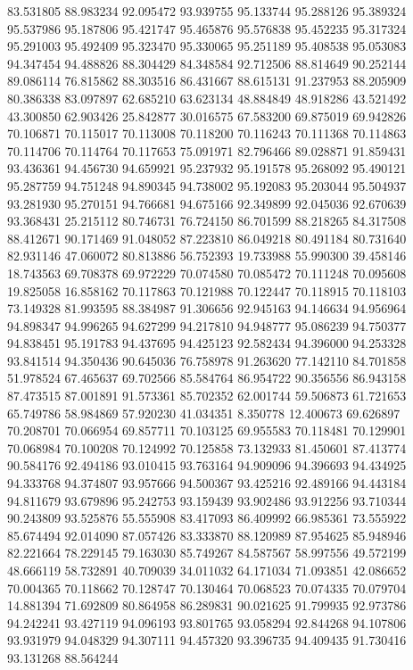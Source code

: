 83.531805
88.983234
92.095472
93.939755
95.133744
95.288126
95.389324
95.537986
95.187806
95.421747
95.465876
95.576838
95.452235
95.317324
95.291003
95.492409
95.323470
95.330065
95.251189
95.408538
95.053083
94.347454
94.488826
88.304429
84.348584
92.712506
88.814649
90.252144
89.086114
76.815862
88.303516
86.431667
88.615131
91.237953
88.205909
80.386338
83.097897
62.685210
63.623134
48.884849
48.918286
43.521492
43.300850
62.903426
25.842877
30.016575
67.583200
69.875019
69.942826
70.106871
70.115017
70.113008
70.118200
70.116243
70.111368
70.114863
70.114706
70.114764
70.117653
75.091971
82.796466
89.028871
91.859431
93.436361
94.456730
94.659921
95.237932
95.191578
95.268092
95.490121
95.287759
94.751248
94.890345
94.738002
95.192083
95.203044
95.504937
93.281930
95.270151
94.766681
94.675166
92.349899
92.045036
92.670639
93.368431
25.215112
80.746731
76.724150
86.701599
88.218265
84.317508
88.412671
90.171469
91.048052
87.223810
86.049218
80.491184
80.731640
82.931146
47.060072
80.813886
56.752393
19.733988
55.990300
39.458146
18.743563
69.708378
69.972229
70.074580
70.085472
70.111248
70.095608
19.825058
16.858162
70.117863
70.121988
70.122447
70.118915
70.118103
73.149328
81.993595
88.384987
91.306656
92.945163
94.146634
94.956964
94.898347
94.996265
94.627299
94.217810
94.948777
95.086239
94.750377
94.838451
95.191783
94.437695
94.425123
92.582434
94.396000
94.253328
93.841514
94.350436
90.645036
76.758978
91.263620
77.142110
84.701858
51.978524
67.465637
69.702566
85.584764
86.954722
90.356556
86.943158
87.473515
87.001891
91.573361
85.702352
62.001744
59.506873
61.721653
65.749786
58.984869
57.920230
41.034351
8.350778
12.400673
69.626897
70.208701
70.066954
69.857711
70.103125
69.955583
70.118481
70.129901
70.068984
70.100208
70.124992
70.125858
73.132933
81.450601
87.413774
90.584176
92.494186
93.010415
93.763164
94.909096
94.396693
94.434925
94.333768
94.374807
93.957666
94.500367
93.425216
92.489166
94.443184
94.811679
93.679896
95.242753
93.159439
93.902486
93.912256
93.710344
90.243809
93.525876
55.555908
83.417093
86.409992
66.985361
73.555922
85.674494
92.014090
87.057426
83.333870
88.120989
87.954625
85.948946
82.221664
78.229145
79.163030
85.749267
84.587567
58.997556
49.572199
48.666119
58.732891
40.709039
34.011032
64.171034
71.093851
42.086652
70.004365
70.118662
70.128747
70.130464
70.068523
70.074335
70.079704
14.881394
71.692809
80.864958
86.289831
90.021625
91.799935
92.973786
94.242241
93.427119
94.096193
93.801765
93.058294
92.844268
94.107806
93.931979
94.048329
94.307111
94.457320
93.396735
94.409435
91.730416
93.131268
88.564244
